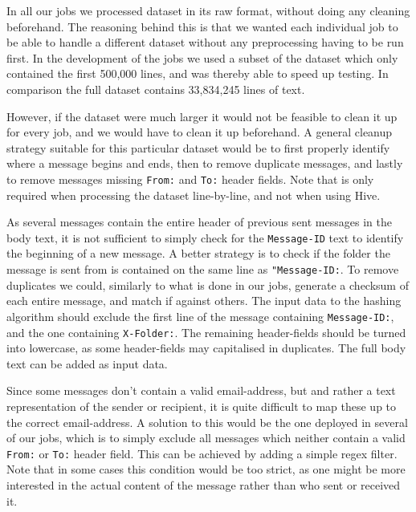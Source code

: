 \documentclass[runningheads,a4paper]{llncs}
\begin{document}
In all our jobs we processed dataset in its raw format, without doing any cleaning beforehand. The reasoning behind this is that we wanted each individual job to be able to handle a different dataset without any preprocessing having to be run first.
In the development of the jobs we used a subset of the dataset which only contained the first 500,000 lines, and was thereby able to speed up testing. In comparison the full dataset contains 33,834,245 lines of text.
\newline

However, if the dataset were much larger it would not be feasible to clean it up for every job, and we would have to clean it up beforehand. A general cleanup strategy suitable for this particular dataset would be to first properly identify where a message begins and ends, then to remove duplicate messages, and lastly to remove messages missing \verb!From:! and \verb!To:! header fields. Note that is only required when processing the dataset line-by-line, and not when using Hive.
\newline

As several messages contain the entire header of previous sent messages in the body text, it is not sufficient to simply check for the \verb!Message-ID! text to identify the beginning of a new message. A better strategy is to check if the folder the message is sent from is contained on the same line as \verb!"Message-ID:!.
\newline
To remove duplicates we could, similarly to what is done in our jobs, generate a checksum of each entire message, and match if against others. The input data to the hashing algorithm should exclude the first line of the message containing \verb!Message-ID:!, and the one containing \verb!X-Folder:!. The remaining header-fields should be turned into lowercase, as some header-fields may capitalised in duplicates. The full body text can be added as input data. 
\newline

Since some messages don't contain a valid email-address, but and rather a text representation of the sender or recipient, it is quite difficult to map these up to the correct email-address. A solution to this would be the one deployed in several of our jobs, which is to simply exclude all messages which neither contain a valid \verb!From:! or \verb!To:! header field. This can be achieved by adding a simple regex filter. Note that in some cases this condition would be too strict, as one might be more interested in the actual content of the message rather than who sent or received it.
\end{document}
